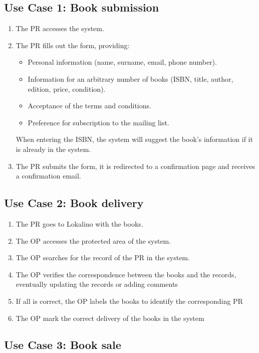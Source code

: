 \subsection{Use Case 1: Book submission}

\begin{enumerate}
    \item The PR accesses the system.
    \item The PR fills out the form, providing:
          \begin{itemize}
              \item Personal information (name, surname, email, phone number).
              \item Information for an arbitrary number of books (ISBN, title, author, edition, price, condition).
              \item Acceptance of the terms and conditions.
              \item Preference for subscription to the mailing list.
          \end{itemize}
          When entering the ISBN, the system will suggest the book's information if it is already in the system.
    \item The PR submits the form, it is redirected to a confirmation page and receives a confirmation email.
\end{enumerate}


\subsection{Use Case 2: Book delivery}

\begin{enumerate}
    \item The PR goes to Lokalino with the books.
    \item The OP accesses the protected area of the system.
    \item The OP searches for the record of the PR in the system.
    \item The OP verifies the correspondence between the books and the records, eventually updating the records or adding comments
    \item If all is correct, the OP labels the books to identify the corresponding PR
    \item The OP mark the correct delivery of the books in the system
\end{enumerate}

\subsection{Use Case 3: Book sale}

